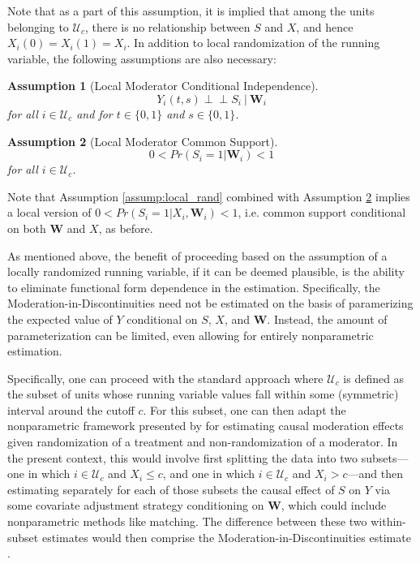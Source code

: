 \documentclass[12pt]{article}
\newtheorem{assumption}{\small\sc Assumption}
\newcommand{\indep}{\perp\!\!\!\!\perp}
\begin{document}
Note that as a part of this assumption, it is implied that among the units belonging to $\mathcal{U}_c$, there is no relationship between $S$ and $X$, and hence $X_i(0) = X_i(1) = X_i$. In addition to local randomization of the running variable, the following assumptions are also necessary:

\begin{assumption}[Local Moderator Conditional Independence] \label{assump:local_mod_cond_indep}
$$Y_i(t,s) \indep S_i \: | \: \bm{W}_i$$
for all $i \in \mathcal{U}_c$ and for $t \in \{ 0, 1\}$ and $s \in \{ 0, 1\}$.
\end{assumption}

\begin{assumption}[Local Moderator Common Support] \label{assump:local_mod_supp}
$$0 < Pr(S_i = 1 |  \bm{W}_i) < 1$$
for all $i \in \mathcal{U}_c$.
\end{assumption}
Note that Assumption \ref{assump:local_rand} combined with Assumption \ref{assump:local_mod_supp} implies a local version of $0 < Pr(S_i = 1 |  X_i, \bm{W}_i) < 1$, i.e. common support conditional on both $\bm{W}$ and $X$, as before.

As mentioned above, the benefit of proceeding based on the assumption of a locally randomized running variable, if it can be deemed plausible, is the ability to eliminate functional form dependence in the estimation. Specifically, the Moderation-in-Discontinuities need not be estimated on the basis of paramerizing the expected value of $Y$ conditional on $S$, $X$, and $\bm{W}$. Instead, the amount of parameterization can be limited, even allowing for entirely nonparametric estimation. 

Specifically, one can proceed with the standard approach where $\mathcal{U}_c$ is defined as the subset of units whose running variable values fall within some (symmetric) interval around the cutoff $c$. For this subset, one can then adapt the nonparametric framework presented by \cite{bansak2021estimating} for estimating causal moderation effects given randomization of a treatment and non-randomization of a moderator. In the present context, this would involve first splitting the data into two subsets---one in which $i \in \mathcal{U}_c$ and $X_i \leq c$, and one in which $i \in \mathcal{U}_c$ and $X_i > c$---and then estimating separately for each of those subsets the causal effect of $S$ on $Y$ via some covariate adjustment strategy conditioning on $\bm{W}$, which could include nonparametric methods like matching. The difference between these two within-subset estimates would then comprise the Moderation-in-Discontinuities estimate \cite[see][for more details]{bansak2021estimating}.
\end{document}
